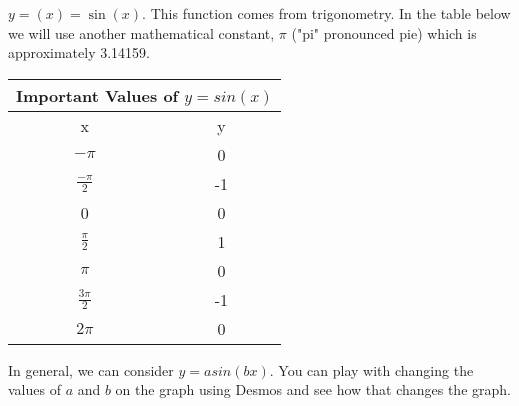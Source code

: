 \documentclass{ximera}
\begin{document}
\begin{example}
$y=(x)=\sin(x)$.  This function comes from trigonometry. In the table below we will use another mathematical constant, $\pi$ ("pi" pronounced pie) which is approximately 3.14159.


\begin{tabular}{ |c || c|  }
 \hline
 \multicolumn{2}{|c|}{Important Values of $y=sin(x)$} \\
\hline
 \hline
 x & y\\
 \hline
 \hline
 $-\pi$&0\\
 \hline
 $\frac{-\pi}{2}$&-1\\
 \hline
 0&0\\
 \hline
 $\frac{\pi}{2}$&1\\
 \hline
 $\pi$&0\\
 \hline
$\frac{3\pi}{2}$&-1\\
 \hline
 $2 \pi$&0\\
 \hline
\end{tabular}

\end{example}

In general, we can consider $y=asin(bx)$.  You can play with changing the values of $a$ and $b$ on the graph using Desmos and see how that changes the graph.  

\begin{center}  
\end{center}
\end{document}
